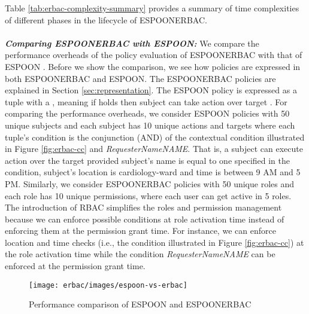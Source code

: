 \documentclass[epsfig,a4paper,11pt,titlepage]{book}
\numberwithin{algorithm}{chapter}
\begin{document}
Table \ref{tab:erbac-complexity-summary} provides a summary of time complexities of different phases in the lifecycle of \gls{ESPOONERBAC}. \\ \\
\noindent \emph{\textbf{Comparing \gls{ESPOONERBAC} with \gls{ESPOON}:}}
We compare the performance overheads of the policy evaluation of \gls{ESPOONERBAC} with that of \gls{ESPOON} \cite{Asghar2011-ARES}. Before we show the comparison, we see how policies are expressed in both \gls{ESPOONERBAC} and \gls{ESPOON}. The \gls{ESPOONERBAC} policies are explained in Section \ref{sec:representation}. The \gls{ESPOON} policy is expressed as a  tuple with a , meaning if  holds then subject  can take action  over target . For comparing the performance overheads, we consider \gls{ESPOON} policies with 50 unique subjects and each subject has 10 unique actions and targets where each  tuple's condition is the conjunction (AND) of the contextual condition illustrated in Figure \ref{fig:erbac-cc} and \emph{RequesterNameNAME}. That is, a subject can execute action over the target provided subject's name is equal to one specified in the condition, subject's location is cardiology-ward and time is between 9 AM and 5 PM. Similarly, we consider \gls{ESPOONERBAC} policies with 50 unique roles and each role has 10 unique permissions, where each user can get active in 5 roles. The introduction of \gls{RBAC} simplifies the roles and permission management because we can enforce possible conditions at role activation time instead of enforcing them at the permission grant time. For instance, we can enforce location and time checks (i.e., the condition illustrated in Figure \ref{fig:erbac-cc}) at the role activation time while the condition \emph{RequesterNameNAME} can be enforced at the permission grant time.

\begin{figure} [htp]
\centering
\texttt{[image: erbac/images/espoon-vs-erbac]}
\caption[Performance comparison of ESPOON and ESPOON]{Performance comparison of \gls{ESPOON} and \gls{ESPOONERBAC}}
\label{fig:erbac-espoon-vs-erbac}
\end{figure}
\end{document}
